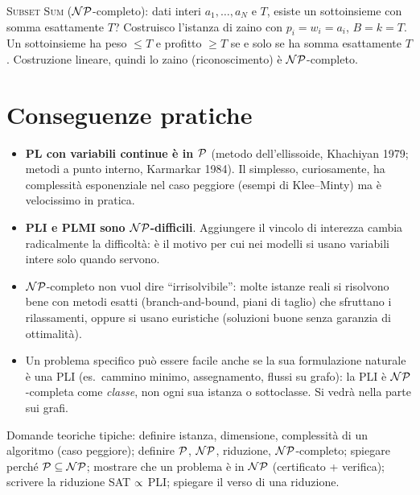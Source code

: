 \begin{esbox}
\textsc{Subset Sum} ($\mathcal{NP}$-completo): dati interi $a_1,\dots,a_N$ e $T$, esiste un sottoinsieme con somma esattamente $T$? Costruisco l'istanza di zaino con $p_i=w_i=a_i$, $B=k=T$. Un sottoinsieme ha peso $\le T$ e profitto $\ge T$ se e solo se ha somma esattamente $T$. Costruzione lineare, quindi lo zaino (riconoscimento) è $\mathcal{NP}$-completo.
\end{esbox}

\section{Conseguenze pratiche}

\begin{itemize}
\item \textbf{PL con variabili continue è in $\mathcal{P}$} (metodo dell'ellissoide, Khachiyan 1979; metodi a punto interno, Karmarkar 1984). Il simplesso, curiosamente, ha complessità esponenziale nel caso peggiore (esempi di Klee--Minty) ma è velocissimo in pratica.
\item \textbf{PLI e PLMI sono $\mathcal{NP}$-difficili}. Aggiungere il vincolo di interezza cambia radicalmente la difficoltà: è il motivo per cui nei modelli si usano variabili intere solo quando servono.
\item $\mathcal{NP}$-completo non vuol dire ``irrisolvibile'': molte istanze reali si risolvono bene con metodi esatti (branch-and-bound, piani di taglio) che sfruttano i rilassamenti, oppure si usano euristiche (soluzioni buone senza garanzia di ottimalità).
\item Un problema specifico può essere facile anche se la sua formulazione naturale è una PLI (es.\ cammino minimo, assegnamento, flussi su grafo): la PLI è $\mathcal{NP}$-completa come \emph{classe}, non ogni sua istanza o sottoclasse. Si vedrà nella parte sui grafi.
\end{itemize}

\begin{esame}
Domande teoriche tipiche: definire istanza, dimensione, complessità di un algoritmo (caso peggiore); definire $\mathcal{P}$, $\mathcal{NP}$, riduzione, $\mathcal{NP}$-completo; spiegare perché $\mathcal{P}\subseteq\mathcal{NP}$; mostrare che un problema è in $\mathcal{NP}$ (certificato + verifica); scrivere la riduzione SAT $\propto$ PLI; spiegare il verso di una riduzione.
\end{esame}

